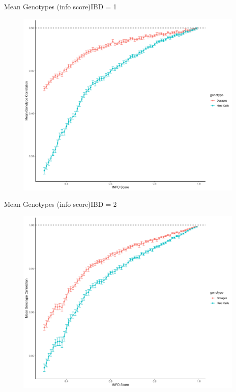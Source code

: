 \documentclass{beamer}
\begin{document}
\begin{frame}{Mean Genotypes (info score)}{IBD = 1}

\begin{figure}

      \includegraphics[width= .85\textwidth]{fig/mean_gt_by_ibd_1.png}
      
\end{figure}

\end{frame}


\begin{frame}{Mean Genotypes (info score)}{IBD = 2}

\begin{figure}

      \includegraphics[width= .85\textwidth]{fig/mean_gt_by_ibd_2.png}
      
\end{figure}

\end{frame}
\end{document}
